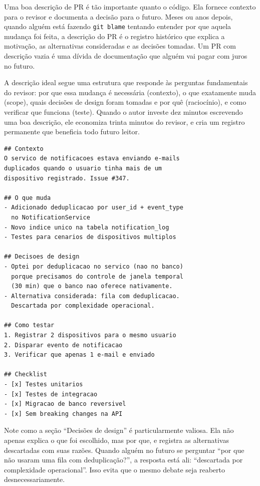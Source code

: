 Uma boa descrição de PR é tão importante quanto o código. Ela fornece contexto
para o revisor e documenta a decisão para o futuro. Meses ou anos depois, quando
alguém está fazendo \texttt{git blame} tentando entender por que aquela mudança foi
feita, a descrição do PR é o registro histórico que explica a motivação, as
alternativas consideradas e as decisões tomadas. Um PR com descrição vazia é uma
dívida de documentação que alguém vai pagar com juros no futuro.

A descrição ideal segue uma estrutura que responde às perguntas fundamentais do
revisor: por que essa mudança é necessária (contexto), o que exatamente muda (scope),
quais decisões de design foram tomadas e por quê (raciocínio), e como verificar que
funciona (teste). Quando o autor investe dez minutos escrevendo uma boa descrição,
ele economiza trinta minutos do revisor, e cria um registro permanente que beneficia
todo futuro leitor.

\begin{lstlisting}[language={}, caption={Exemplo de Descrição de Pull Request}]
## Contexto
O servico de notificacoes estava enviando e-mails
duplicados quando o usuario tinha mais de um
dispositivo registrado. Issue #347.

## O que muda
- Adicionado deduplicacao por user_id + event_type
  no NotificationService
- Novo indice unico na tabela notification_log
- Testes para cenarios de dispositivos multiplos

## Decisoes de design
- Optei por deduplicacao no servico (nao no banco)
  porque precisamos do controle de janela temporal
  (30 min) que o banco nao oferece nativamente.
- Alternativa considerada: fila com deduplicacao.
  Descartada por complexidade operacional.

## Como testar
1. Registrar 2 dispositivos para o mesmo usuario
2. Disparar evento de notificacao
3. Verificar que apenas 1 e-mail e enviado

## Checklist
- [x] Testes unitarios
- [x] Testes de integracao
- [x] Migracao de banco reversivel
- [x] Sem breaking changes na API
\end{lstlisting}

Note como a seção ``Decisões de design'' é particularmente valiosa. Ela não apenas
explica o que foi escolhido, mas por que, e registra as alternativas descartadas com
suas razões. Quando alguém no futuro se perguntar ``por que não usaram uma fila com
deduplicação?'', a resposta está ali: ``descartada por complexidade operacional''.
Isso evita que o mesmo debate seja reaberto desnecessariamente.

